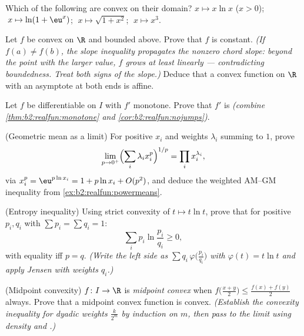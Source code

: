 \begin{exercise}[$\star$]\label{exo:b2:realfun:3}
Which of the following are convex on their domain? $x \mapsto
x\ln x$ ($x > 0$); $\;x \mapsto \ln(1 + \eu^x)$; $\;x \mapsto
\sqrt{1 + x^2}$; $\;x \mapsto x^3$.
\end{exercise}

\begin{exercise}[$\star\star$]\label{exo:b2:realfun:4}
Let $f$ be convex on $\R$ and bounded above. Prove that $f$ is
constant. \emph{(If $f(a) \neq f(b)$, the slope inequality
propagates the nonzero chord slope: beyond the point with the larger
value, $f$ grows at least linearly --- contradicting boundedness.
Treat both signs of the slope.)} Deduce that a convex function on
$\R$ with an asymptote at both ends is affine.
\end{exercise}

\begin{exercise}[$\star\star$]\label{exo:b2:realfun:5}
Let $f$ be differentiable on $I$ with $f'$ monotone. Prove that
$f'$ is  \emph{(combine
\cref{thm:b2:realfun:monotone} and
\cref{cor:b2:realfun:nojumps})}.
\end{exercise}

\begin{exercise}[$\star\star$]\label{exo:b2:realfun:6}
(Geometric mean as a limit) For positive $x_i$ and weights
$\lambda_i$ summing to $1$, prove
\[
\lim_{p \to 0^+} \Bigl(\sum_i \lambda_i x_i^p\Bigr)^{1/p}
= \prod_i x_i^{\lambda_i} ,
\]
via $x_i^p = \eu^{p\ln x_i} = 1 + p\ln x_i + O(p^2)$, and deduce
the weighted AM--GM inequality from
\cref{ex:b2:realfun:powermeans}.
\end{exercise}

\begin{exercise}[$\star\star$]\label{exo:b2:realfun:7}
(Entropy inequality) Using strict convexity of $t \mapsto t\ln t$,
prove that for positive $p_i, q_i$ with $\sum p_i = \sum q_i = 1$:
\[
\sum_i p_i \ln\frac{p_i}{q_i} \geq 0 ,
\]
with equality iff $p = q$. \emph{(Write the left side as $\sum q_i\,
\varphi\bigl(\frac{p_i}{q_i}\bigr)$ with $\varphi(t) = t\ln t$ and
apply Jensen with weights $q_i$.)}
\end{exercise}

\begin{exercise}[$\star\star\star$]\label{exo:b2:realfun:8}
(Midpoint convexity) $f \colon I \to \R$ is \emph{midpoint convex}
when $f\bigl(\frac{x+y}{2}\bigr) \leq \frac{f(x) + f(y)}{2}$
always. Prove that a \emph{} midpoint convex function is
convex. \emph{(Establish the convexity inequality for dyadic
weights $\frac{k}{2^m}$ by induction on $m$, then pass to the limit
using density and .)}
\end{exercise}

